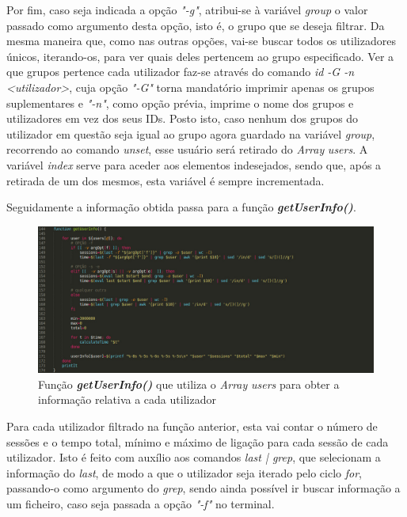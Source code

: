 \documentclass[10pt,portuguese]{article}
\begin{document}
\par Por fim, caso seja indicada a opção \textit{"-g"}, atribui-se à variável \textit{group} o valor passado como argumento desta opção, isto é, o grupo que se deseja filtrar. Da mesma maneira que, como nas outras opções, vai-se buscar todos os utilizadores únicos, iterando-os, para ver quais deles pertencem ao grupo especificado. Ver a que grupos pertence cada utilizador faz-se através do comando \textit{id -G -n <utilizador>}, cuja opção \textit{"-G"} torna mandatório imprimir apenas os grupos suplementares e \textit{"-n"}, como opção prévia, imprime o nome dos grupos e utilizadores em vez dos seus IDs. Posto isto, caso nenhum dos grupos do utilizador em questão seja igual ao grupo agora guardado na variável \textit{group}, recorrendo ao comando \textit{unset}, esse usuário será retirado do \textit{Array} \textit{users}. A variável \textit{index} serve para aceder aos elementos indesejados, sendo que, após a retirada de um dos mesmos, esta variável é sempre incrementada. 
\newpage
\par Seguidamente a informação obtida passa para a função \textbf{\textit{getUserInfo()}}.
\begin{figure}[!h]
    \centering
    \includegraphics[width=\textwidth]{getUsersInfo.jpeg}
    \caption{Função \textbf{\textit{getUserInfo()}} que utiliza o \textit{Array} \textit{users} para obter a informação relativa a cada utilizador}
\end{figure}
\par Para cada utilizador filtrado na função anterior, esta vai contar o número de sessões e o tempo total, mínimo e máximo de ligação para cada sessão de cada utilizador. Isto é feito com auxílio aos comandos \textit{last  |  grep}, que selecionam a informação do \textit{last}, de modo a que o utilizador seja iterado pelo ciclo \textit{for}, passando-o como argumento do \textit{grep}, sendo ainda possível ir buscar informação a um ficheiro, caso seja passada a opção \textit{"-f"} no terminal.
\end{document}
